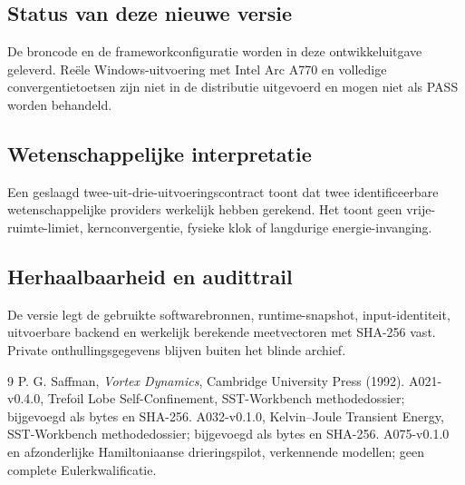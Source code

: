 \documentclass[10pt,a4paper]{article}
\begin{document}
\subsection{Status van deze nieuwe versie}
De broncode en de frameworkconfiguratie worden in deze ontwikkeluitgave geleverd. Reële Windows-uitvoering met Intel Arc A770 en volledige convergentietoetsen zijn niet in de distributie uitgevoerd en mogen niet als PASS worden behandeld.
\subsection{Wetenschappelijke interpretatie}
Een geslaagd twee-uit-drie-uitvoeringscontract toont dat twee identificeerbare wetenschappelijke providers werkelijk hebben gerekend. Het toont geen vrije-ruimte-limiet, kernconvergentie, fysieke klok of langdurige energie-invanging.
\subsection{Herhaalbaarheid en audittrail}
De versie legt de gebruikte softwarebronnen, runtime-snapshot, input-identiteit, uitvoerbare backend en werkelijk berekende meetvectoren met SHA-256 vast. Private onthullingsgegevens blijven buiten het blinde archief.

\begin{thebibliography}{9}
 P. G. Saffman, \emph{Vortex Dynamics}, Cambridge University Press (1992).
 A021-v0.4.0, Trefoil Lobe Self-Confinement, SST-Workbench methodedossier; bijgevoegd als bytes en SHA-256.
 A032-v0.1.0, Kelvin--Joule Transient Energy, SST-Workbench methodedossier; bijgevoegd als bytes en SHA-256.
 A075-v0.1.0 en afzonderlijke Hamiltoniaanse drieringspilot, verkennende modellen; geen complete Eulerkwalificatie.
\end{thebibliography}
\end{document}

